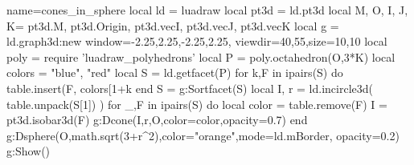 \documentclass[border=5pt]{standalone}%
\begin{document}
\begin{luadraw}{name=cones_in_sphere}
local ld = luadraw
local pt3d = ld.pt3d
local M, O, I, J, K= pt3d.M, pt3d.Origin,  pt3d.vecI, pt3d.vecJ, pt3d.vecK
local g = ld.graph3d:new{ window={-2.25,2.25,-2.25,2.25}, viewdir={40,55},size={10,10}}
local poly = require 'luadraw_polyhedrons'
local P = poly.octahedron(O,3*K)
local colors = {"blue", "red"}
local S = ld.getfacet(P)
for k,F in ipairs(S) do
    table.insert(F, colors[1+k%
end
S = g:Sortfacet(S)
local I, r = ld.incircle3d( table.unpack(S[1]) )
for _,F in ipairs(S) do
    local color = table.remove(F)
    I = pt3d.isobar3d(F)
    g:Dcone(I,r,O,{color=color,opacity=0.7})
end
g:Dsphere(O,math.sqrt(3+r^2),{color="orange",mode=ld.mBorder, opacity=0.2})
g:Show()
\end{luadraw}
\end{document}

